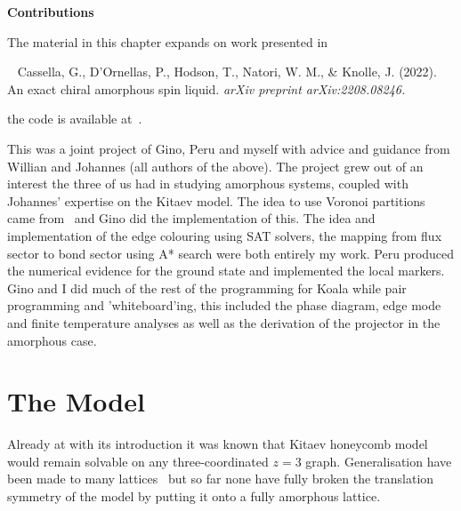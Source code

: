 \textbf{Contributions}

The material in this chapter expands on work presented in

~\autocite{cassellaExactChiralAmorphous2022} Cassella, G., D'Ornellas, P., Hodson, T., Natori, W. M., \& Knolle, J. (2022). An exact chiral amorphous spin liquid. \emph{arXiv preprint arXiv:2208.08246.}

the code is available at~\autocite{hodsonKoalaKitaevAmorphous2022}.

This was a joint project of Gino, Peru and myself with advice and guidance from Willian and Johannes (all authors of the above). The project grew out of an interest the three of us had in studying amorphous systems, coupled with Johannes' expertise on the Kitaev model. The idea to use Voronoi partitions came from~\autocite{marsalTopologicalWeaireThorpe2020} and Gino did the implementation of this. The idea and implementation of the edge colouring using SAT solvers, the mapping from flux sector to bond sector using A* search were both entirely my work. Peru produced the numerical evidence for the ground state and implemented the local markers. Gino and I did much of the rest of the programming for Koala while pair programming and 'whiteboard'ing, this included the phase diagram, edge mode and finite temperature analyses as well as the derivation of the projector in the amorphous case.

\hypertarget{amk-Model}{%
\section{The Model}\label{amk-Model}}

Already at with its introduction it was known that Kitaev honeycomb model would remain solvable on any three-coordinated \(z=3\) graph. Generalisation have been made to many lattices~\autocite{eschmannThermodynamicClassificationThreedimensional2020,Yao2009,eschmann2019thermodynamics,Peri2020} but so far none have fully broken the translation symmetry of the model by putting it onto a fully amorphous lattice.

